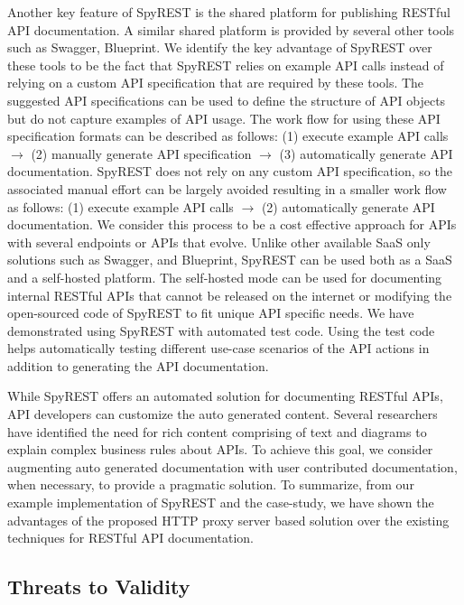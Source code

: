 \documentclass[conference]{IEEEtran}
\begin{document}
Another key feature of SpyREST is the shared platform for publishing RESTful API documentation. A similar shared platform is provided by several other tools such as Swagger, Blueprint. We identify the key advantage of SpyREST over these tools to be the fact that SpyREST relies on example API calls instead of relying on a custom API specification that are required by these tools. The suggested API specifications can be used to define the structure of API objects but do not capture examples of API usage. The work flow for using these API specification formats can be described as follows: (1) execute example API calls $\longrightarrow$ (2) manually generate API specification $\longrightarrow$ (3) automatically generate API documentation. SpyREST does not rely on any custom API specification, so the associated manual effort can be largely avoided resulting in a smaller work flow as follows: (1) execute example API calls $\longrightarrow$ (2) automatically generate API documentation. We consider this process to be a cost effective approach for APIs with several endpoints or APIs that evolve. Unlike other available SaaS only solutions such as Swagger, and Blueprint, SpyREST can be used both as a SaaS and a self-hosted platform. The self-hosted mode can be used for documenting internal RESTful APIs that cannot be released on the internet or modifying the open-sourced code of SpyREST to fit unique API specific needs. We have demonstrated using SpyREST with automated test code. Using the test code helps automatically testing different use-case scenarios of the API actions in addition to generating the API documentation.

While SpyREST offers an automated solution for documenting RESTful APIs, API developers can customize the auto generated content. Several researchers have identified the need for rich content comprising of text and diagrams to explain complex business rules about APIs. To achieve this goal, we consider augmenting auto generated documentation with user contributed documentation, when necessary, to provide a pragmatic solution. To summarize, from our example implementation of SpyREST and the case-study, we have shown the advantages of the proposed HTTP proxy server based solution over the existing techniques for RESTful API documentation.

\subsection{Threats to Validity} %
\label{sub:threats_to_validity}
\end{document}
